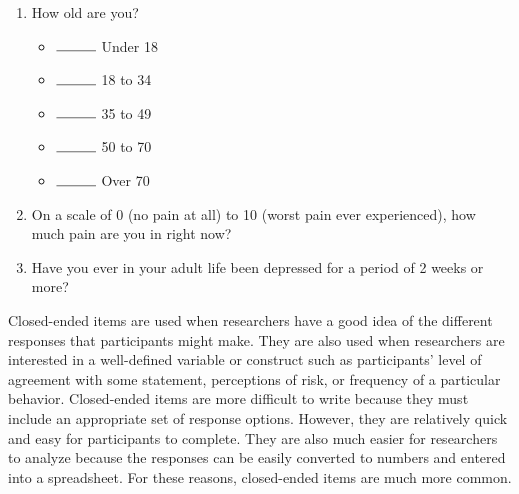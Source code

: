 \begin{enumerate}

\item How old are you?

\begin{itemize}

\item $\rule{1cm}{0.15mm}$ Under 18

\item  $\rule{1cm}{0.15mm}$ 18 to 34

\item  $\rule{1cm}{0.15mm}$ 35 to 49

\item  $\rule{1cm}{0.15mm}$ 50 to 70

\item  $\rule{1cm}{0.15mm}$ Over 70

\end{itemize}


\item On a scale of 0 (no pain at all) to 10 (worst pain ever experienced), how much pain are you in right now?


\item Have you ever in your adult life been depressed for a period of 2 weeks or more?

\end{enumerate}


Closed-ended items are used when researchers have a good idea of the different responses that participants might make. They are also used when researchers are interested in a well-defined variable or construct such as participants’ level of agreement with some statement, perceptions of risk, or frequency of a particular behavior. Closed-ended items are more difficult to write because they must include an appropriate set of response options. However, they are relatively quick and easy for participants to complete. They are also much easier for researchers to analyze because the responses can be easily converted to numbers and entered into a spreadsheet. For these reasons, closed-ended items are much more common.


